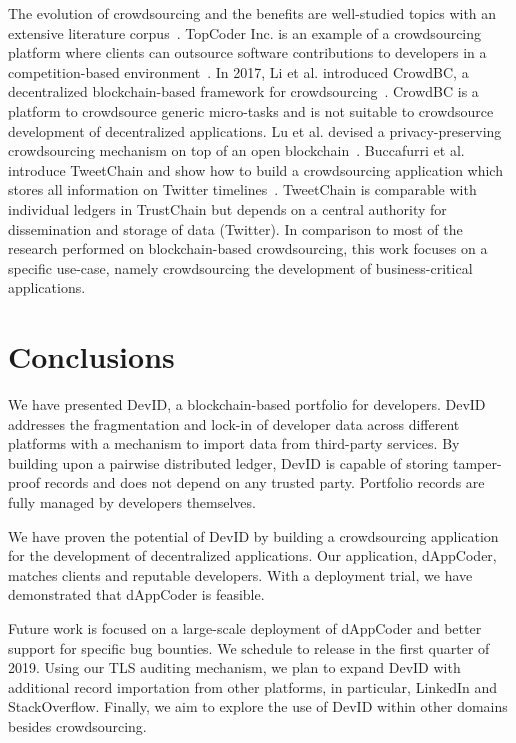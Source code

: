 The evolution of crowdsourcing and the benefits are well-studied topics with an extensive literature corpus~\cite{latoza2016crowdsourcing}.
TopCoder Inc. is an example of a crowdsourcing platform where clients can outsource software contributions to developers in a competition-based environment~\cite{lakhani2010topcoder}.
In 2017, Li et al. introduced CrowdBC, a decentralized blockchain-based framework for crowdsourcing~\cite{li2017crowdbc}.
CrowdBC is a platform to crowdsource generic micro-tasks and is not suitable to crowdsource development of decentralized applications.
Lu et al. devised a privacy-preserving crowdsourcing mechanism on top of an open blockchain~\cite{lu2018zebralancer}.
Buccafurri et al. introduce TweetChain and show how to build a crowdsourcing application which stores all information on Twitter timelines~\cite{buccafurri2017tweetchain}.
TweetChain is comparable with individual ledgers in TrustChain but depends on a central authority for dissemination and storage of data (Twitter).
In comparison to most of the research performed on blockchain-based crowdsourcing, this work focuses on a specific use-case, namely crowdsourcing the development of business-critical applications.

\section{Conclusions}
We have presented DevID, a blockchain-based portfolio for developers.
DevID addresses the fragmentation and lock-in of developer data across different platforms with a mechanism to import data from third-party services.
By building upon a pairwise distributed ledger, DevID is capable of storing tamper-proof records and does not depend on any trusted party.
Portfolio records are fully managed by developers themselves.

We have proven the potential of DevID by building a crowdsourcing application for the development of decentralized applications.
Our application, dAppCoder, matches clients and reputable developers.
With a deployment trial, we have demonstrated that dAppCoder is feasible.

Future work is focused on a large-scale deployment of dAppCoder and better support for specific bug bounties.
We schedule to release in the first quarter of 2019.
Using our TLS auditing mechanism, we plan to expand DevID with additional record importation from other platforms, in particular, LinkedIn and StackOverflow.
Finally, we aim to explore the use of DevID within other domains besides crowdsourcing.